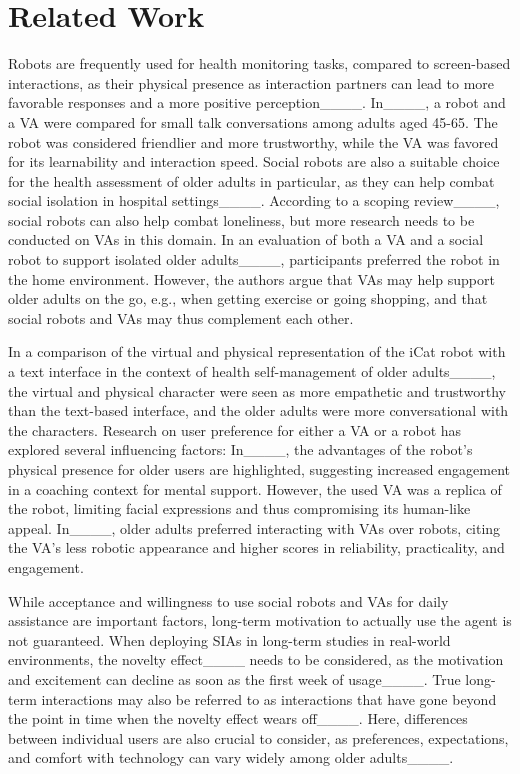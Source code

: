 \section{Related Work}
\label{sec:rel-work}
Robots are frequently used for health monitoring tasks, compared to screen-based interactions, as their physical presence as interaction partners can lead to more favorable responses and a more positive perception____.
In____, a robot and a \ac{VA} were compared for small talk conversations among adults aged 45-65. 
The robot was considered friendlier and more trustworthy, while the \ac{VA} was favored for its learnability and interaction speed. 
Social robots are also a suitable choice for the health assessment of older adults in particular, as they can help combat social isolation in hospital settings____.
According to a scoping review____, social robots can also help combat loneliness, but more research needs to be conducted on \acp{VA} in this domain. 
In an evaluation of both a \ac{VA} and a social robot to support isolated older adults____, participants preferred the robot in the home environment. 
However, the authors argue that \acp{VA} may help support older adults on the go, e.g., when getting exercise or going shopping, and that social robots and \acp{VA} may thus complement each other. 

In a comparison of the virtual and physical representation of the iCat robot with a text interface in the context of health self-management of older adults____, the virtual and physical character were seen as more empathetic and trustworthy than the text-based interface, and the older adults were more conversational with the characters. 
Research on user preference for either a \ac{VA} or a robot has explored several influencing factors: 
In____, the advantages of the robot's physical presence for older users are highlighted, suggesting increased engagement in a coaching context for mental support. 
However, the used \ac{VA} was a replica of the robot, limiting facial expressions and thus compromising its human-like appeal. 
In____, older adults preferred interacting with \acp{VA} over robots, citing the \ac{VA}'s less robotic appearance and higher scores in reliability, practicality, and engagement.

While acceptance and willingness to use social robots and \acp{VA} for daily assistance are important factors, long-term motivation to actually use the agent is not guaranteed. 
When deploying \acp{SIA} in long-term studies in real-world environments, the novelty effect____ needs to be considered, as the motivation and excitement can decline as soon as the first week of usage____. 
True long-term interactions may also be referred to as interactions that have gone beyond the point in time when the novelty effect wears off____. 
Here, differences between individual users are also crucial to consider, as preferences, expectations, and comfort with technology can vary widely among older adults____. 

